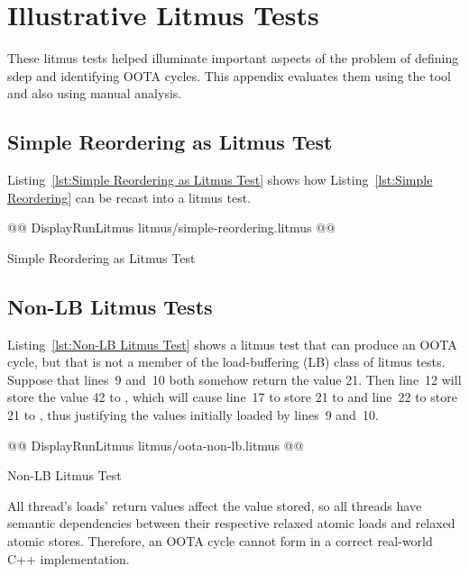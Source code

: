 \documentclass[10]{article}
\begin{document}
\clearpage

\section{Illustrative Litmus Tests}
\label{app:Illustrative Litmus Tests}

These litmus tests helped illuminate important aspects of the problem
of defining sdep and identifying OOTA cycles.
This appendix evaluates them using the  tool and also using
manual analysis.

\subsection{Simple Reordering as Litmus Test}
\label{app:Simple Reordering as Litmus Test}

Listing~\ref{lst:Simple Reordering as Litmus Test}
shows how
Listing~\ref{lst:Simple Reordering}
can be recast into a  litmus test.

\begin{listing}[tbp]
@@ DisplayRunLitmus litmus/simple-reordering.litmus @@
\caption{Simple Reordering as Litmus Test}
\label{lst:Simple Reordering as Litmus Test}
\end{listing}

\subsection{Non-LB Litmus Tests}
\label{app:Non-LB Litmus Tests}

Listing~\ref{lst:Non-LB Litmus Test}
shows a litmus test that can produce an OOTA cycle, but that is not
a member of the load-buffering (LB) class of litmus tests.
Suppose that lines~9 and~10 both somehow return the value 21.
Then line~12 will store the value 42 to , which will cause
line~17 to store 21 to  and line~22 to store 21 to ,
thus justifying the values initially loaded by lines~9 and~10.

\begin{listing}[tbp]
@@ DisplayRunLitmus litmus/oota-non-lb.litmus @@
\caption{Non-LB Litmus Test}
\label{lst:Non-LB Litmus Test}
\end{listing}

All thread's loads' return values affect the value stored, so all
threads have semantic dependencies between their respective relaxed
atomic loads and relaxed atomic stores.
Therefore, an OOTA cycle cannot form in a correct real-world C++
implementation.
\end{document}
